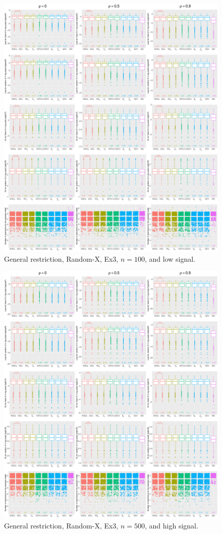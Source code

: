 \begin{figure}[!ht]
\centering
\includegraphics[width=\textwidth]{figures/supplement/randomx/general_restriction/Ex3_n100_lsnr.eps}
\caption{General restriction, Random-X, Ex3, $n=100$, and low signal.}
\end{figure}
\clearpage
\begin{figure}[!ht]
\centering
\includegraphics[width=\textwidth]{figures/supplement/randomx/general_restriction/Ex3_n500_hsnr.eps}
\caption{General restriction, Random-X, Ex3, $n=500$, and high signal.}
\end{figure}
